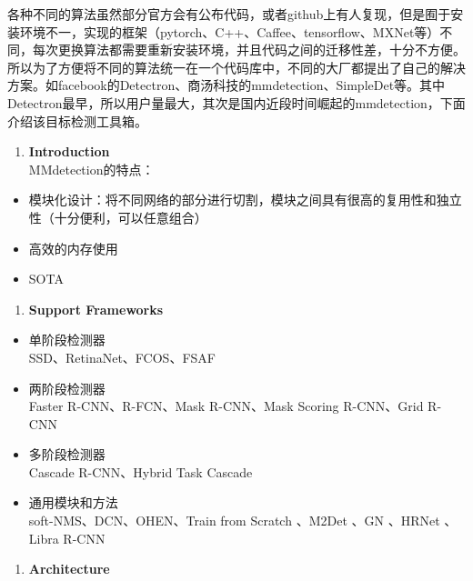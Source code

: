 各种不同的算法虽然部分官方会有公布代码，或者github上有人复现，但是囿于安装环境不一，实现的框架（pytorch、C++、Caffee、tensorflow、MXNet等）不同，每次更换算法都需要重新安装环境，并且代码之间的迁移性差，十分不方便。所以为了方便将不同的算法统一在一个代码库中，不同的大厂都提出了自己的解决方案。如facebook的Detectron、商汤科技的mmdetection、SimpleDet等。其中Detectron最早，所以用户量最大，其次是国内近段时间崛起的mmdetection，下面介绍该目标检测工具箱。

\begin{enumerate}
\def\labelenumi{\arabic{enumi}.}
\item
  \textbf{Introduction}\\
  MMdetection的特点：
\end{enumerate}

\begin{itemize}
\item
  模块化设计：将不同网络的部分进行切割，模块之间具有很高的复用性和独立性（十分便利，可以任意组合）
\item
  高效的内存使用
\item
  SOTA
\end{itemize}

\begin{enumerate}
\def\labelenumi{\arabic{enumi}.}
\setcounter{enumi}{1}
\item
  \textbf{Support Frameworks}\\
\end{enumerate}

\begin{itemize}
\item
  单阶段检测器\\
  SSD、RetinaNet、FCOS、FSAF
\item
  两阶段检测器\\
  Faster R-CNN、R-FCN、Mask R-CNN、Mask Scoring R-CNN、Grid R-CNN
\item
  多阶段检测器\\
  Cascade R-CNN、Hybrid Task Cascade
\item
  通用模块和方法\\
  soft-NMS、DCN、OHEN、Train from Scratch 、M2Det 、GN 、HRNet 、Libra
  R-CNN
\end{itemize}

\begin{enumerate}
\def\labelenumi{\arabic{enumi}.}
\setcounter{enumi}{2}
\item
  \textbf{Architecture}
\end{enumerate}

